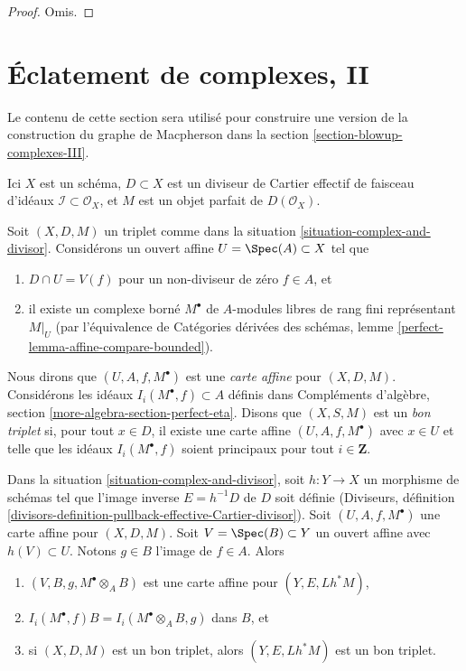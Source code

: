 \begin{proof}
Omis.
\end{proof}





\section{Éclatement de complexes, II}
\label{section-blowup-complexes-II}

\noindent
Le contenu de cette section sera utilisé pour construire une version de la
construction du graphe de Macpherson dans la section \ref{section-blowup-complexes-III}.

\begin{situation}
\label{situation-complex-and-divisor}
Ici $X$ est un schéma, $D \subset X$ est un diviseur de Cartier effectif
de faisceau d'idéaux $\mathcal{I} \subset \mathcal{O}_X$, et
$M$ est un objet parfait de $D(\mathcal{O}_X)$.
\end{situation}

\noindent
Soit $(X, D, M)$ un triplet comme dans la
situation \ref{situation-complex-and-divisor}.
Considérons un ouvert affine $U = \Spec(A) \subset X$
tel que
\begin{enumerate}
\item $D \cap U = V(f)$ pour un non-diviseur de zéro $f \in A$, et
\item il existe un complexe borné $M^\bullet$ de
$A$-modules libres de rang fini représentant $M|_U$ (par l'équivalence de
Catégories dérivées des schémas, lemme
\ref{perfect-lemma-affine-compare-bounded}).
\end{enumerate}
Nous dirons que $(U, A, f, M^\bullet)$ est une
{\it carte affine} pour $(X, D, M)$.
Considérons les idéaux $I_i(M^\bullet, f) \subset A$ définis dans
Compléments d'algèbre, section \ref{more-algebra-section-perfect-eta}.
Disons que $(X, S, M)$ est un {\it bon triplet} si, pour tout $x \in D$,
il existe une carte affine $(U, A, f, M^\bullet)$
avec $x \in U$ et telle que les idéaux $I_i(M^\bullet, f)$ soient principaux pour tout
$i \in \mathbf{Z}$.

\begin{lemma}
\label{lemma-pullback-triple-ideals-good}
Dans la situation \ref{situation-complex-and-divisor}, soit $h : Y \to X$ un
morphisme de schémas tel que l'image inverse $E = h^{-1}D$ de $D$
soit définie (Diviseurs, définition
\ref{divisors-definition-pullback-effective-Cartier-divisor}).
Soit $(U, A, f, M^\bullet)$ une carte affine pour $(X, D, M)$.
Soit $V = \Spec(B) \subset Y$ un ouvert affine avec $h(V) \subset U$.
Notons $g \in B$ l'image de $f \in A$.
Alors
\begin{enumerate}
\item $(V, B, g, M^\bullet \otimes_A B)$ est une carte affine pour $(Y, E, Lh^*M)$,
\item $I_i(M^\bullet, f)B = I_i(M^\bullet \otimes_A B, g)$ dans $B$, et
\item si $(X, D, M)$ est un bon triplet, alors
$(Y, E, Lh^*M)$ est un bon triplet.
\end{enumerate}
\end{lemma}

